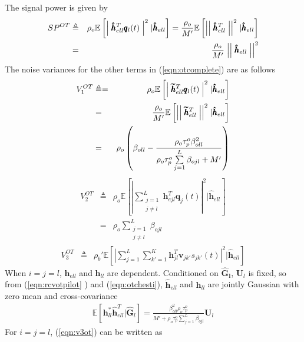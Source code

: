 \documentclass[10pt, a4paper, twoside,fleqn]{article}
\begin{document}
The signal power is given by
\begin{eqnarray}
SP^{OT} &\triangleq& \rho_o\mathbb{E}\left[\Bigm|\pmb{\hat h}_{ell}^T \pmb{q}_l(t)\Bigm|^2 | \pmb{\hat h}_{ell}\right] = \frac{\rho_o}{M'}\mathbb{E}\left[\Bigm|\Bigm|\pmb{\hat h}^T_{ell}\Bigm|\Bigm|^2 | \pmb{\hat h}_{ell}\right] \nonumber \\    
         &=& \frac{\rho_o}{M'} \Bigm|\Bigm|\pmb{\hat h}_{ell}\Bigm|\Bigm|^2
\end{eqnarray}
The noise variances for the other terms in (\ref{eqn:otcomplete}) are as follows
\begin{eqnarray}\label{eqn:otv1}
	V_1^{OT} &\triangleq=& \rho_o\mathbb{E}\left[\Bigm|\pmb{\widetilde{h}}_{ell}^T \pmb{q}_l(t)\Bigm|^2|\pmb{\hat h}_{ell}\right] \nonumber \\
            &=& \frac{\rho_o}{M'} \mathbb{E}\left[\Bigm|\Bigm|\pmb{\widetilde{h}}^T_{ell}\Bigm|\Bigm|^2 |\pmb{\hat h}_{ell}\right] \nonumber \\
            &=& \rho_o\left(\beta_{oll}-\frac{\rho_o\tau_p^o\beta^2_{oll}}{\rho_o\tau_p^o\sum\limits_{j=1}^{L}\beta_{ojl}+M'}\right)          
\end{eqnarray}
\begin{eqnarray}\label{eqn:otv2}
	V_2^{OT} &\triangleq& \rho_o \mathbb{E}\left[\left\vert\sum_{\substack{j=1 \\ j \neq l}}^{L} \pmb{h}^T_{ejl} \pmb{q}_j(t)\right\vert^2|\pmb{\hat h}_{ell}\right] \nonumber \\
            &=& \rho_o\sum_{\substack{j=1 \\ j\neq l}}^{L} \beta_{ojl}
\end{eqnarray}
\begin{eqnarray}\label{eqn:v3ot}
	V_3^{OT} &\triangleq& \rho_b' \mathbb{E}\left[\left| \sum_{j=1}^{L}\sum_{k'=1}^{K} \pmb{h}^T_{jl} \pmb{v}_{jk'}s_{jk'}(t) \right|^2 | \pmb{\hat h}_{ell} \right] 
\end{eqnarray}
When $i=j=l$, $\pmb{\hat h}_{ell}$ and $\pmb{h}_{ll}$ are dependent. Conditioned on $\pmb{\widehat{G}_l}$, $\pmb{U}_l$ is fixed, so from (\ref{eqn:rcvotpilot}
) and (\ref{eqn:otchesti}), $\pmb{\hat h}_{ell}$ and $\pmb{h}_{ll}$ are jointly Gaussian with zero mean and cross-covariance
\begin{eqnarray}\label{eqn:hehellvar}
\mathbb{E}[\pmb{h}_{ll}^* \pmb{\hat h}_{ell}^T | \pmb{\widehat{G}}_{l}] = \frac{\beta_{oll}^{2}\rho_o\tau_p^o}{M'+\rho_o\tau_p^o\sum\limits_{j=1}^{L}\beta_{ojl}}\pmb{U}_l
\end{eqnarray}
For $i=j=l$, (\ref{eqn:v3ot}) can be written as
\end{document}

